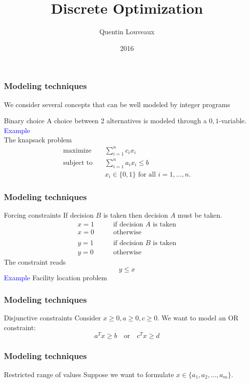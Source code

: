 \documentclass[9pt,handout]{beamer}
\title{Discrete Optimization}
\author{Quentin
Louveaux}
\institute{ULg - Institut Montefiore}
\date{2016}
\begin{document}
\begin{frame}
  \titlepage
\end{frame}
\begin{frame}
\frametitle{Modeling techniques}
We consider several concepts that can be well modeled
by \alert{integer programs}
\begin{block}{Binary choice}
A \alert{choice} between 2 alternatives is modeled through a 
$0,1$-variable.\\
\textcolor{blue}{Example}\\
The \alert{knapsack problem}
\begin{align*}
\text{maximize}\quad & \sum_{i=1}^n c_i x_i\\
\text{subject to}\quad& \sum_{i=1}^n a_i x_i \leq b\\
& x_i\in \{0,1\}\text{ for all }i=1,\ldots,n.
\end{align*}
\end{block}
\end{frame}
\begin{frame}
\frametitle{Modeling techniques}
\begin{block}{Forcing constraints}
\alert{If} decision $B$ is taken \alert{then} decision $A$ must be taken.
\begin{align*}
x=1\qquad & \text{if decision $A$ is taken}\\
x=0\qquad & \text{otherwise}\\
\\
y=1\qquad & \text{if decision $B$ is taken}\\
y=0\qquad & \text{otherwise}
\end{align*}
The constraint reads
\alert{$$y\leq x$$}
\textcolor{blue}{Example} Facility location problem
\end{block}
\end{frame}
\begin{frame}
\frametitle{Modeling techniques}
\begin{block}{Disjunctive constraints}
Consider $x\geq 0, a\geq 0, c\geq 0$.
We want to model an \alert{OR} constraint:
$$ a^T x \geq b \quad \text{or}\quad c^Tx \geq d $$
\end{block}
\end{frame}
\begin{frame}
\frametitle{Modeling techniques}
\begin{block}{Restricted range of values}
Suppose we want to formulate $x\in \{a_1,a_2,\ldots, a_m\}$.\bigskip

\end{block}
\end{frame}
\end{document}
